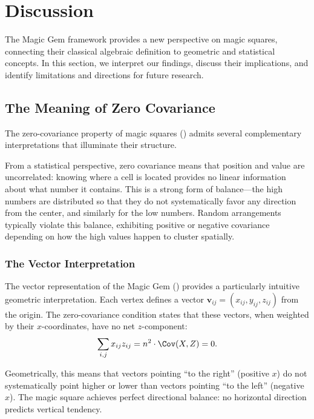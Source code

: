 \section{Discussion}
\label{sec:discussion}

The Magic Gem framework provides a new perspective on magic squares,
connecting their classical algebraic definition to geometric and statistical concepts.
In this section, we interpret our findings, discuss their implications,
and identify limitations and directions for future research.

\subsection{The Meaning of Zero Covariance}

The zero-covariance property of magic squares () 
admits several complementary interpretations that illuminate their structure.

From a statistical perspective, zero covariance means that position and value are uncorrelated:
knowing where a cell is located provides no linear information about what number it contains.
This is a strong form of balance---the high numbers are distributed so that they do not systematically 
favor any direction from the center, and similarly for the low numbers.
Random arrangements typically violate this balance, exhibiting positive or negative covariance
depending on how the high values happen to cluster spatially.

\subsubsection{The Vector Interpretation}

The vector representation of the Magic Gem () provides a particularly 
intuitive geometric interpretation.
Each vertex defines a vector $\mathbf{v}_{ij} = (x_{ij}, y_{ij}, z_{ij})$ from the origin.
The zero-covariance condition states that these vectors, when weighted by their $x$-coordinates, 
have no net $z$-component:
\[
\sum_{i,j} x_{ij} z_{ij} = n^2 \cdot \Cov(X,Z) = 0.
\]

Geometrically, this means that vectors pointing ``to the right'' (positive $x$) 
do not systematically point higher or lower than vectors pointing ``to the left'' (negative $x$).
The magic square achieves perfect directional balance: 
no horizontal direction predicts vertical tendency.

